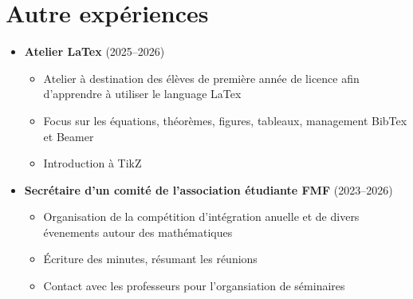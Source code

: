 \section*{Autre expériences}
\begin{itemize}
    \item \textbf{Atelier LaTex} (2025--2026) \begin{itemize}
        \item Atelier à destination des élèves de première année de licence afin
        d'apprendre à utiliser le language LaTex 
        \item Focus sur les équations, théorèmes, figures, tableaux, management
        BibTex et Beamer 
        \item Introduction à TikZ 
    \end{itemize}
    \item \textbf{Secrétaire d'un comité de l'association étudiante FMF} (2023--2026)\begin{itemize}
    \item Organisation de la compétition d'intégration anuelle et de divers
    évenements autour des mathématiques
    \item Écriture des minutes, résumant les réunions 
    \item Contact avec les professeurs pour l'organsiation de séminaires 
\end{itemize}
\end{itemize}